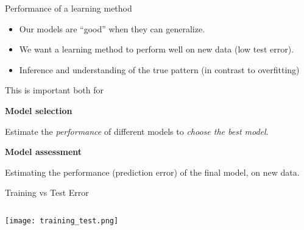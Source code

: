 \documentclass[10pt,ignorenonframetext,]{beamer}
\begin{document}
\begin{frame}{Performance of a learning method}
\protect\hypertarget{performance-of-a-learning-method}{}

\begin{itemize}
\item
  Our models are ``good'' when they can generalize.
\item
  We want a learning method to perform well on new data (low test
  error).
\item
  Inference and understanding of the true pattern (in contrast to
  overfitting)
\end{itemize}

\vspace{2mm}

This is important both for

\textbf{Model selection}

Estimate the \emph{performance} of different models to \emph{choose the
best model}.

\textbf{Model assessment}

Estimating the performance (prediction error) of the final model, on new
data.

\end{frame}

\begin{frame}

\begin{block}{Training vs Test Error}

\(~\)

\centering

\texttt{[image: training\_test.png]}

\end{block}

\end{frame}
\end{document}
